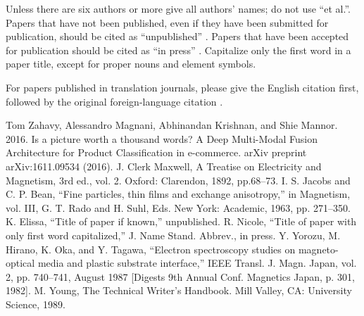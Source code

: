 \documentclass[conference]{IEEEtran}
\begin{document}
Unless there are six authors or more give all authors' names; do not use 
``et al.''. Papers that have not been published, even if they have been 
submitted for publication, should be cited as ``unpublished'' \cite{b4}. Papers 
that have been accepted for publication should be cited as ``in press'' \cite{b5}. 
Capitalize only the first word in a paper title, except for proper nouns and 
element symbols.

For papers published in translation journals, please give the English 
citation first, followed by the original foreign-language citation \cite{b6}.

\begin{thebibliography}{00}
 Tom Zahavy, Alessandro Magnani, Abhinandan Krishnan, and Shie Mannor. 2016.
Is a picture worth a thousand words? A Deep Multi-Modal Fusion Architecture
for Product Classification in e-commerce. arXiv preprint arXiv:1611.09534 (2016).
 J. Clerk Maxwell, A Treatise on Electricity and Magnetism, 3rd ed., vol. 2. Oxford: Clarendon, 1892, pp.68--73.
 I. S. Jacobs and C. P. Bean, ``Fine particles, thin films and exchange anisotropy,'' in Magnetism, vol. III, G. T. Rado and H. Suhl, Eds. New York: Academic, 1963, pp. 271--350.
 K. Elissa, ``Title of paper if known,'' unpublished.
 R. Nicole, ``Title of paper with only first word capitalized,'' J. Name Stand. Abbrev., in press.
 Y. Yorozu, M. Hirano, K. Oka, and Y. Tagawa, ``Electron spectroscopy studies on magneto-optical media and plastic substrate interface,'' IEEE Transl. J. Magn. Japan, vol. 2, pp. 740--741, August 1987 [Digests 9th Annual Conf. Magnetics Japan, p. 301, 1982].
 M. Young, The Technical Writer's Handbook. Mill Valley, CA: University Science, 1989.
\end{thebibliography}
\end{document}
